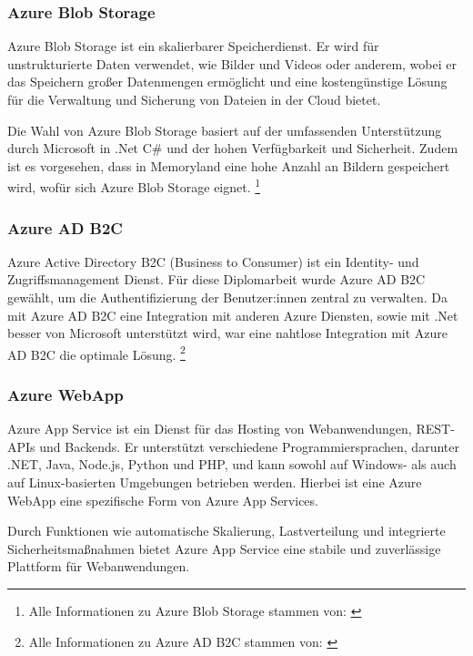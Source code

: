 \subsubsection{Azure Blob Storage}
\label{subsection:azure_blob_storage}

Azure Blob Storage ist ein skalierbarer Speicherdienst. Er wird für unstrukturierte Daten verwendet, 
wie Bilder und Videos oder anderem, wobei er das Speichern großer Datenmengen 
ermöglicht und eine kostengünstige Lösung für die Verwaltung und Sicherung von Dateien 
in der Cloud bietet. 

Die Wahl von Azure Blob Storage basiert auf der umfassenden Unterstützung durch Microsoft 
in .Net C\# und der hohen Verfügbarkeit und Sicherheit. Zudem ist es vorgesehen, dass in Memoryland
eine hohe Anzahl an Bildern gespeichert wird, wofür sich Azure Blob Storage eignet.
\footnote{Alle Informationen zu Azure Blob Storage stammen von: \cite{MicrosoftCorporationu}}

\subsubsection{Azure AD B2C}
\label{subsection:azure_ad_b2c}

Azure Active Directory B2C (Business to Consumer) ist ein Identity- und Zugriffsmanagement Dienst.
Für diese Diplomarbeit wurde Azure AD B2C gewählt, um die Authentifizierung der Benutzer:innen
zentral zu verwalten. Da mit Azure AD B2C eine Integration mit anderen Azure Diensten, sowie mit
.Net besser von Microsoft unterstützt wird, war eine nahtlose Integration mit Azure AD B2C 
die optimale Lösung.
\footnote{Alle Informationen zu Azure AD B2C stammen von: \cite{MicrosoftCorporationw} \cite{MicrosoftCorporationx}}

\subsubsection{Azure WebApp}
\label{subsection:azure_web_app}

Azure App Service ist ein Dienst für das Hosting von Webanwendungen, REST-APIs und 
Backends. Er unterstützt verschiedene Programmiersprachen, darunter .NET, Java, 
Node.js, Python und PHP, und kann sowohl auf Windows- als auch auf Linux-basierten 
Umgebungen betrieben werden. Hierbei ist eine Azure WebApp eine spezifische Form
von Azure App Services.

Durch Funktionen wie automatische Skalierung, Lastverteilung und integrierte 
Sicherheitsmaßnahmen bietet Azure App Service eine stabile und zuverlässige 
Plattform für Webanwendungen.

